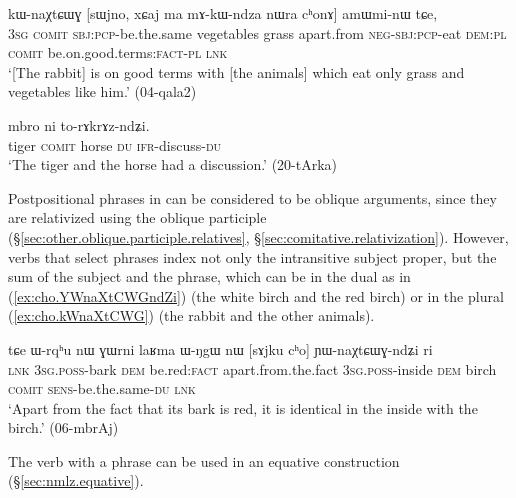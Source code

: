 \begin{exe}
\ex \label{ex:cho.kWnaXtCWG}
 kɯ-naχtɕɯɣ [sɯjno, xɕaj ma mɤ-kɯ-ndza nɯra cʰonɤ] amɯmi-nɯ tɕe, \\
\textsc{3sg} \textsc{comit} \textsc{sbj}:\textsc{pcp}-be.the.same vegetables grass apart.from \textsc{neg}-\textsc{sbj}:\textsc{pcp}-eat \textsc{dem}:\textsc{pl} \textsc{comit} be.on.good.terms:\textsc{fact}-\textsc{pl} \textsc{lnk} \\
\glt `[The rabbit] is on good terms with [the animals] which eat only grass and vegetables like him.' (04-qala2)
\end{exe}

\begin{exe}
\ex \label{ex:cho.torAkrAzndZi}
 mbro ni to-rɤkrɤz-ndʑi. \\
tiger \textsc{comit} horse \textsc{du} \textsc{ifr}-discuss-\textsc{du} \\
\glt `The tiger and the horse had a discussion.' (20-tArka)
\end{exe}

Postpositional phrases in  can be considered to be oblique arguments, since they are relativized using the oblique participle (§\ref{sec:other.oblique.participle.relatives}, §\ref{sec:comitative.relativization}). However, verbs that select  phrases index not only the intransitive subject proper, but the sum of the subject and the  phrase, which can be in the dual as in (\ref{ex:cho.YWnaXtCWGndZi}) (the white birch and the red birch) or in the plural (\ref{ex:cho.kWnaXtCWG}) (the rabbit and the other animals). 

\begin{exe}
\ex \label{ex:cho.YWnaXtCWGndZi}
\gll tɕe ɯ-rqʰu nɯ ɣɯrni laʁma ɯ-ŋgɯ nɯ [sɤjku cʰo] ɲɯ-naχtɕɯɣ-ndʑi ri\\
\textsc{lnk} \textsc{3sg}.\textsc{poss}-bark \textsc{dem} be.red:\textsc{fact} apart.from.the.fact \textsc{3sg}.\textsc{poss}-inside \textsc{dem} birch \textsc{comit} \textsc{sens}-be.the.same-\textsc{du} \textsc{lnk} \\
\glt `Apart from the fact that its bark is red, it is identical in the inside with the birch.' (06-mbrAj)
\end{exe}

The verb  with a  phrase can be used in an equative construction (§\ref{sec:nmlz.equative}).

